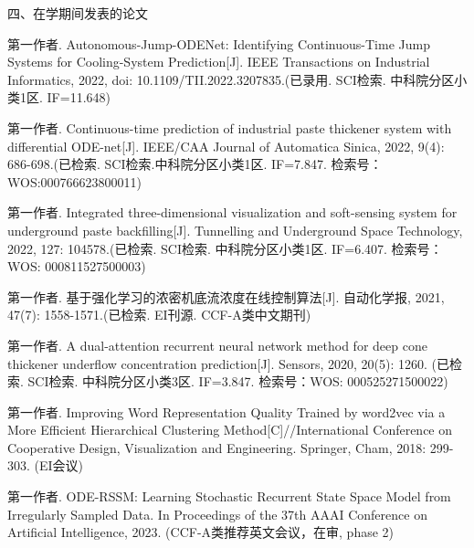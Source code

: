 \noindent 四、在学期间发表的论文 \par
\begin{enumerate}[label={[\arabic*]}]  %
\item 第一作者. Autonomous-Jump-ODENet: Identifying Continuous-Time Jump Systems for Cooling-System Prediction[J]. IEEE Transactions on Industrial Informatics, 2022, doi: 10.1109/TII.2022.3207835.(已录用. SCI检索. 中科院分区小类1区. IF=11.648) 
\item 第一作者. Continuous-time prediction of industrial paste thickener system with differential ODE-net[J]. IEEE/CAA Journal of Automatica Sinica, 2022, 9(4): 686-698.(已检索. SCI检索.中科院分区小类1区. IF=7.847. 检索号：WOS:000766623800011)  
\item 第一作者. Integrated three-dimensional visualization and soft-sensing system for underground paste backfilling[J]. Tunnelling and Underground Space Technology, 2022, 127: 104578.(已检索. SCI检索. 中科院分区小类1区. IF=6.407. 检索号：WOS: 000811527500003) 
\item 第一作者. 基于强化学习的浓密机底流浓度在线控制算法[J]. 自动化学报, 2021, 47(7): 1558-1571.(已检索. EI刊源. CCF-A类中文期刊) 
\item 第一作者. A dual-attention recurrent neural network method for deep cone thickener underflow concentration prediction[J]. Sensors, 2020, 20(5): 1260. (已检索. SCI检索. 中科院分区小类3区. IF=3.847. 检索号：WOS: 000525271500022)  
\item 第一作者. Improving Word Representation Quality Trained by word2vec via a More Efficient Hierarchical Clustering Method[C]//International Conference on Cooperative Design, Visualization and Engineering. Springer, Cham, 2018: 299-303. (EI会议)
\item 第一作者. ODE-RSSM: Learning Stochastic Recurrent State Space Model from Irregularly Sampled Data. In Proceedings of the 37th AAAI Conference on Artificial Intelligence, 2023. (CCF-A类推荐英文会议，在审, phase 2)

\end{enumerate}
